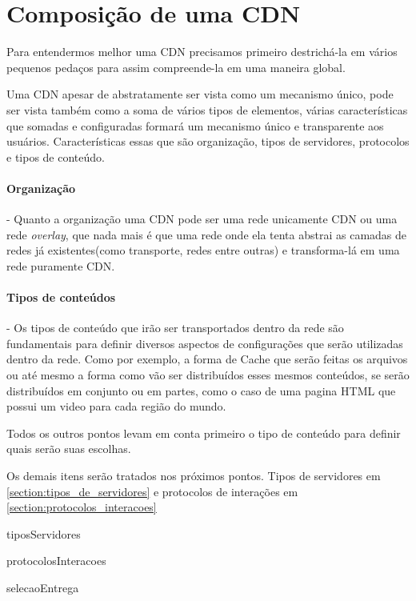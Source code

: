 \section{Composi\c{c}\~ao de uma CDN} \label{sec:composicao}

Para entendermos melhor uma CDN precisamos primeiro destrich\'a-la em v\'arios pequenos peda\c{c}os para assim compreende-la em uma maneira global.

Uma CDN apesar de abstratamente ser vista como um mecanismo \'unico, pode ser vista tamb\'em como a soma de v\'arios tipos de elementos, v\'arias caracter\'isticas que somadas e configuradas formar\'a um mecanismo \'unico e transparente aos usu\'arios. Caracter\'isticas essas que s\~ao organiza\c{c}\~ao, tipos de servidores, protocolos e tipos de conte\'udo.

\paragraph{Organiza\c{c}\~ao}- Quanto a organiza\c{c}\~ao uma CDN pode ser uma rede unicamente CDN ou uma rede \textit{overlay}, que nada mais \'e que uma rede onde ela tenta abstrai as camadas de redes j\'a existentes(como transporte, redes entre outras) e transforma-l\'a em uma rede puramente CDN.

\paragraph{Tipos de conte\'udos}- Os tipos de conte\'udo que ir\~ao ser transportados dentro da rede s\~ao fundamentais para definir diversos aspectos de configura\c{c}\~oes que ser\~ao utilizadas dentro da rede. Como por exemplo, a forma de Cache que ser\~ao feitas os arquivos ou at\'e mesmo a forma como v\~ao ser distribu\'idos esses mesmos conte\'udos, se ser\~ao distribu\'idos em conjunto ou em partes, como o caso de uma pagina HTML que possui um video para cada regi\~ao do  mundo. 

Todos os outros pontos levam em conta primeiro o tipo de conte\'udo para definir quais ser\~ao suas escolhas.

Os demais itens ser\~ao tratados nos pr\'oximos pontos. Tipos de servidores em \ref{section:tipos_de_servidores} e protocolos de intera\c{c}\~oes em \ref{section:protocolos_interacoes}

{tiposServidores}

{protocolosInteracoes}

{selecaoEntrega}
